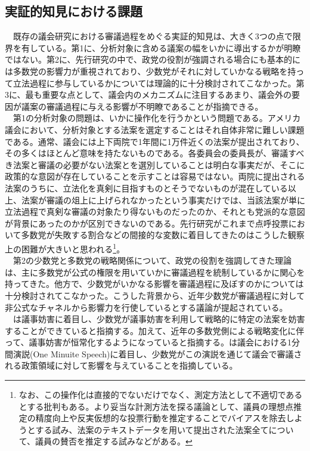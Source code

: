 \documentclass{article}
\begin{document}
\subsection{実証的知見における課題}
　既存の議会研究における審議過程をめぐる実証的知見は、大きく3つの点で限界を有している。第1に、分析対象に含める議案の幅をいかに導出するかが明瞭ではない。第2に、先行研究の中で、政党の役割が強調される場合にも基本的には多数党の影響力が重視されており、少数党がそれに対していかなる戦略を持って立法過程に参与しているかについては理論的に十分検討されてこなかった。第3に、最も重要な点として、議会内のメカニズムに注目するあまり、議会外の要因が議案の審議過程に与える影響が不明瞭であることが指摘できる。\\
　第1の分析対象の問題は、いかに操作化を行うかという問題である。アメリカ議会において、分析対象とする法案を選定することはそれ自体非常に難しい課題である。通常、議会には上下両院で1年間に1万件近くの法案が提出されており、その多くはほとんど意味を持たないものである。各委員会の委員長が、審議すべき法案と審議の必要がない法案とを選別していることは明白な事実だが、そこに政策的な意図が存在していることを示すことは容易ではない。両院に提出される法案のうちに、立法化を真剣に目指すものとそうでないものが混在している以上、法案が審議の俎上に上げられなかったという事実だけでは、当該法案が単に立法過程で真剣な審議の対象たり得ないものだったのか、それとも党派的な意図が背景にあったのかが区別できないのである。先行研究がこれまで点呼投票において多数党が失敗する割合などの間接的な変数に着目してきたのはこうした観察上の困難が大きいと思われる\footnote{なお、この操作化は直接的でないだけでなく、測定方法として不適切であるとする批判もある。\citep*{Patterson2020-rh}より妥当な計測方法を探る議論として、議員の理想点推定の精度向上\citep*{Stiglitz2010-zh}や反実仮想的な投票行動を推定することでバイアスを除去しようとする試み\citep*{Robinson2015-jd}、法案のテキストデータを用いて提出された法案全てについて、議員の賛否を推定する試み\citep*{Ballard2022-gi}などがある。}。\\
　第2の少数党と多数党の戦略関係について、政党の役割を強調してきた理論は、主に多数党が公式の権限を用いていかに審議過程を統制しているかに関心を持ってきた。他方で、少数党がいかなる影響を審議過程に及ぼすのかについては十分検討されてこなかった。こうした背景から、近年少数党が審議過程に対して非公式なチャネルから影響力を行使しているとする議論が提起されている。\\
　\citet*{Koger2010-uc}は議事妨害に着目し、少数党が議事妨害を利用して戦略的に特定の法案を妨害することができていると指摘する。加えて、近年の多数党側による戦略変化に伴って、議事妨害が恒常化するようになっていると指摘する。\citet*{Hughes2018-dj}は議会における1分間演説(One Minuite Speech)に着目し、少数党がこの演説を通じて議会で審議される政策領域に対して影響を与えていることを指摘している。\\
\end{document}
